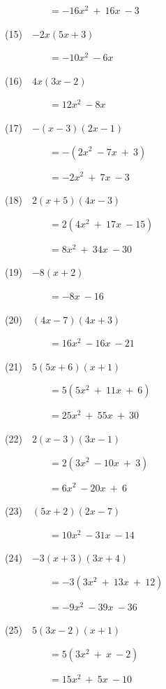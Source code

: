 \documentclass[a4j,twocolumn,10pt,fleqn]{jarticle}
\begin{document}
~~~~~~~~~$=-16x^2~+~16x~-3$

(15)~~$-2x(5x+3)$

~~~~~~~~~$=-10x^2~-6x$

(16)~~$4x(3x-2)$

~~~~~~~~~$=12x^2~-8x$

(17)~~$-(x-3)(2x-1)$

~~~~~~~~~$=-(2x^2~-7x~+~3)$

~~~~~~~~~$=-2x^2~+~7x~-3$

(18)~~$2(x+5)(4x-3)$

~~~~~~~~~$=2(4x^2~+~17x~-15)$

~~~~~~~~~$=8x^2~+~34x~-30$

(19)~~$-8(x+2)$

~~~~~~~~~$=-8x~-16$

(20)~~$(4x-7)(4x+3)$

~~~~~~~~~$=16x^2~-16x~-21$

(21)~~$5(5x+6)(x+1)$

~~~~~~~~~$=5(5x^2~+~11x~+~6)$

~~~~~~~~~$=25x^2~+~55x~+~30$

(22)~~$2(x-3)(3x-1)$

~~~~~~~~~$=2(3x^2~-10x~+~3)$

~~~~~~~~~$=6x^2~-20x~+~6$

(23)~~$(5x+2)(2x-7)$

~~~~~~~~~$=10x^2~-31x~-14$

(24)~~$-3(x+3)(3x+4)$

~~~~~~~~~$=-3(3x^2~+~13x~+~12)$

~~~~~~~~~$=-9x^2~-39x~-36$

(25)~~$5(3x-2)(x+1)$

~~~~~~~~~$=5(3x^2~+~x~-2)$

~~~~~~~~~$=15x^2~+~5x~-10$
\end{document}

